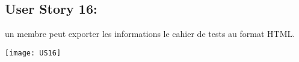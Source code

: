 \newpage{}
\subsection{User Story 16:}
un membre peut exporter les informations le cahier de tests au format HTML.


  \begin{center}
        \texttt{[image: US16]}
  \end{center}